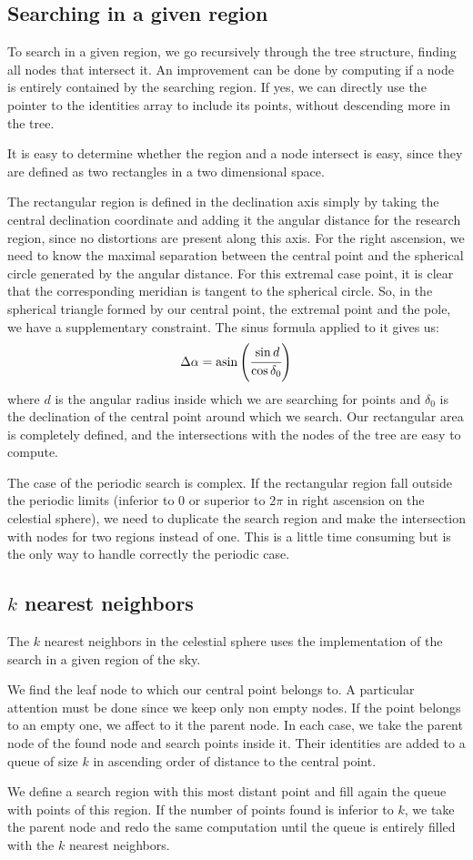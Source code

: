 \subsection{Searching in a given region}
%
To search in a given region, we go recursively through the tree structure, finding all
nodes that intersect it. An improvement can be done by computing if a node
is entirely contained by the searching region. If yes, we can directly use
the pointer to the identities array to include its points, without
descending more in the tree.

It is easy to determine whether the region and a node intersect is easy, since
they are defined as two rectangles in a two dimensional space.

The rectangular region is defined in the declination axis simply by taking
the central declination coordinate and adding it the angular distance for
the research region, since no distortions are present along this axis. For
the right ascension, we need to know the maximal separation between the
central point and the spherical circle generated by the angular distance.
For this extremal case point, it is clear that the corresponding meridian is
tangent to the spherical circle. So, in the spherical triangle formed by our
central point, the extremal point and the pole, we have a supplementary
constraint. The sinus formula applied to it gives us:
%
\begin{equation}
    \Delta\alpha = \mathrm{asin}\left(\cfrac{\sin d}{\cos\delta_0}\right)
\end{equation}
%
where $d$ is the angular radius inside which we are searching for points and
$\delta_0$ is the declination of the central point around which we search.
Our rectangular area is completely defined, and the intersections with the
nodes of the tree are easy to compute.

The case of the periodic search is complex. If the rectangular region fall
outside the periodic limits (inferior to 0 or superior to $2\pi$ in right
ascension on the celestial sphere), we need to duplicate the search region
and make the intersection with nodes for two regions instead of one. This is
a little time consuming but is the only way to handle correctly the periodic
case.
%
\subsection{$k$ nearest neighbors}
%
The $k$ nearest neighbors in the celestial sphere uses the implementation of
the search in a given region of the sky.

We find the leaf node to which our central point belongs to. A particular
attention must be done since we keep only non empty nodes. If the point
belongs to an empty one, we affect to it the parent node. In each case, we
take the parent node of the found node and search points inside it. Their
identities are added to a queue of size $k$ in ascending order of distance
to the central point.

We define a search region with this most distant point and fill again the
queue with points of this region. If the number of points found is inferior
to $k$, we take the parent node and redo the same computation until the
queue is entirely filled with the $k$ nearest neighbors.
